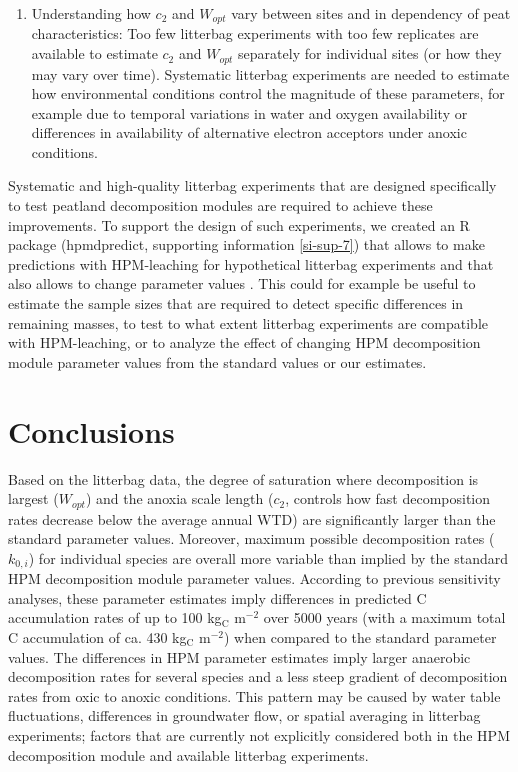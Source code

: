 \documentclass[esd, manuscript]{copernicus}
\begin{document}
\begin{enumerate}
\item
  Understanding how \(c_2\) and \(W_{opt}\) vary between sites and in dependency of peat characteristics: Too few litterbag experiments with too few replicates are available to estimate \(c_2\) and \(W_{opt}\) separately for individual sites (or how they may vary over time). Systematic litterbag experiments are needed to estimate how environmental conditions control the magnitude of these parameters, for example due to temporal variations in water and oxygen availability or differences in availability of alternative electron acceptors under anoxic conditions.
\end{enumerate}

Systematic and high-quality litterbag experiments that are designed specifically to test peatland decomposition modules are required to achieve these improvements. To support the design of such experiments, we created an R package (hpmdpredict, supporting information \ref{si-sup-7}) that allows to make predictions with HPM-leaching for hypothetical litterbag experiments and that also allows to change parameter values \citep{Teickner.2024b}. This could for example be useful to estimate the sample sizes that are required to detect specific differences in remaining masses, to test to what extent litterbag experiments are compatible with HPM-leaching, or to analyze the effect of changing HPM decomposition module parameter values from the standard values or our estimates.

\section{Conclusions}

Based on the litterbag data, the degree of saturation where decomposition is largest (\(W_{opt}\)) and the anoxia scale length (\(c_2\), controls how fast decomposition rates decrease below the average annual WTD) are significantly larger than the standard parameter values. Moreover, maximum possible decomposition rates (\(k_{0,i}\)) for individual species are overall more variable than implied by the standard HPM decomposition module parameter values. According to previous sensitivity analyses, these parameter estimates imply differences in predicted C accumulation rates of up to 100 kg\(_\text{C}\) m\(^{-2}\) over 5000 years (with a maximum total C accumulation of ca. 430 kg\(_\text{C}\) m\(^{-2}\)) when compared to the standard parameter values. The differences in HPM parameter estimates imply larger anaerobic decomposition rates for several species and a less steep gradient of decomposition rates from oxic to anoxic conditions. This pattern may be caused by water table fluctuations, differences in groundwater flow, or spatial averaging in litterbag experiments; factors that are currently not explicitly considered both in the HPM decomposition module and available litterbag experiments.
\end{document}
